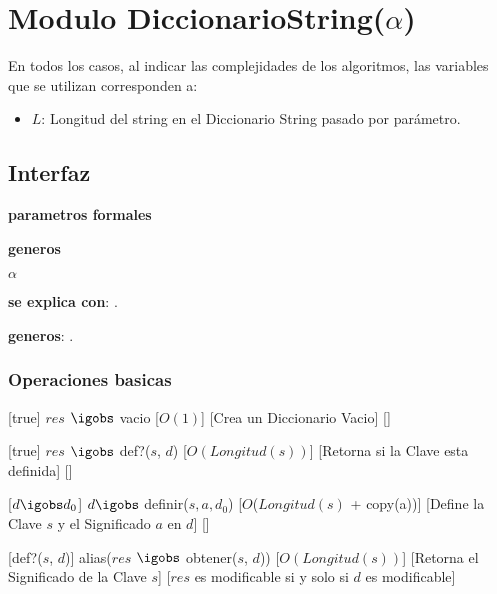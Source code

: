 \section{Modulo DiccionarioString($\alpha $)}

  En todos los casos, al indicar las complejidades de los algoritmos, las variables que se utilizan corresponden a:
  \vspace{-0.5em}\begin{itemize}
    \item $L$: Longitud del string en el Diccionario String pasado por par\'ametro.

  \end{itemize}
  


\subsection{Interfaz}
  
  \textbf{parametros formales}  \parindent \\
  \parbox{1.7cm}{\textbf{generos}} $\alpha$
  
  \textbf{se explica con}: .
 
  \textbf{generos}: .
  

\subsubsection{Operaciones basicas}
  
  [true]
  {$res$ $\igobs$ vacio}%
  [$O(1)$]
  [Crea un Diccionario Vacio]
  []

  [true]
	{$res$ $\igobs$ def?($s$, $d$)}
	[$O(Longitud(s))$]
	[Retorna si la Clave esta definida]
	[]
  

  [$ d \igobs d_0 $]
  {$ d \igobs$ definir($s, a, d_0$)}
  [$O$($Longitud(s)$ + copy(a))]
  [Define la Clave $s$ y el Significado $a$ en $d$]
  []
  
  [def?($s$, $d$)]
  {alias($res$ $\igobs$ obtener($s$, $d$))}
  [$O(Longitud(s))$]
  [Retorna el Significado de la Clave $s$]
  [$res$ es modificable si y solo si $d$ es modificable]
  
